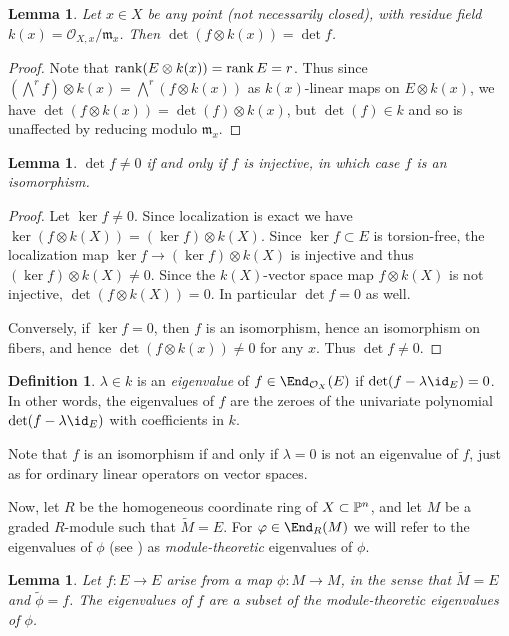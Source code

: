\documentclass[12pt]{amsart}
\let\wtilde\widetilde
\def\OO{\mathcal O}
\def\m{\mathfrak m}
\theoremstyle{theorem}
\numberwithin{thm}{section}
\newtheorem{lem}[thm]{Lemma}
\theoremstyle{definition}
\newtheorem{dfn}[thm]{Definition}
\begin{document}
\begin{lem}
  Let $x \in X$ be any point (not necessarily closed), with residue field $k(x) = \OO_{X,x}/\m_x$. Then $\det(f\otimes k(x)) =\det f$.
\end{lem}
\begin{proof}
  Note that $\rank( E\otimes k(x)) = \rank E = r$. Thus since $(\bigwedge^r f)\otimes k(x) = \bigwedge^r( f\otimes k(x))$ as $k(x)$-linear maps on $E\otimes k(x)$,
  we have $\det(f\otimes k(x)) =\det(f)\otimes k(x)$, but $\det(f)\in k$ and so is unaffected by reducing modulo $\m_x$.
\end{proof}

\begin{lem}
  $\det f \neq 0 $ if and only if $f$ is injective, in which case $f$ is an isomorphism.
\end{lem}
\begin{proof}
  Let $\ker f \neq 0$. Since localization is exact we have $\ker(f\otimes k(X)) = (\ker f)\otimes k(X)$.  Since $\ker f \subset E$ is torsion-free, the localization map $\ker f \to (\ker f)\otimes k(X)$ is injective and thus $(\ker f) \otimes k(X)\neq 0$. Since the $k(X)$-vector space map $f\otimes k(X)$ is not injective, $\det(f\otimes k(X))= 0$. In particular  $\det f = 0$ as well.

  Conversely, if $\ker f = 0$, then $f$ is an isomorphism, hence an isomorphism on fibers, and hence $\det(f\otimes k(x)) \neq 0$ for any $x$. Thus $\det f\neq 0$.
\end{proof}

\begin{dfn}
  $\lambda \in k$ is an \emph{eigenvalue} of $f \in \End_{\OO_X}(E)$ if $\det(f-\lambda \id_E)= 0$. In other words, the eigenvalues of $f$ are the zeroes of the univariate polynomial $\det(f - \lambda\id _E)$ with coefficients in $k$.
\end{dfn}

Note that $f$ is an isomorphism if and only if $\lambda=0$ is not an eigenvalue of $f$, just as for ordinary linear operators on vector spaces.

Now, let $R$ be the homogeneous coordinate ring of $X\subset \P^n$, and let $M$ be a graded $R$-module such that $\wtilde M=E$. For $\phi\in\End_R(M)$ we will refer to the eigenvalues of $\phi$ (see ) as \emph{module-theoretic} eigenvalues of $\phi$.

\begin{lem}
  Let $f\colon E\to E$ arise from a map $\phi\colon M\to M$, in the sense that $\wtilde M = E$ and $\wtilde\phi = f$. The eigenvalues of $f$ are a subset of the module-theoretic eigenvalues of $\phi$.
\end{lem}
\end{document}

